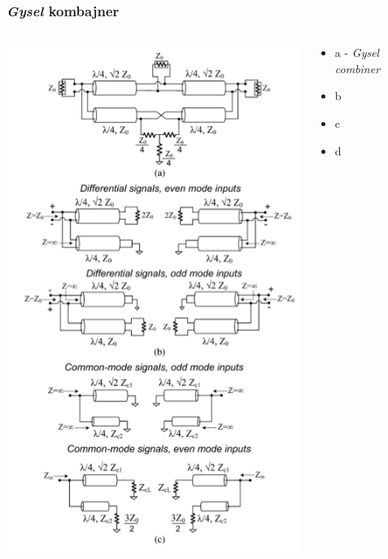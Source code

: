 \documentclass{beamer}
\begin{document}
\begin{frame}
  \frametitle{\textit{Gysel} kombajner}
  \begin{columns}
  \begin{column}{0.5\textwidth}
    \includegraphics[width=0.85\linewidth]{Gysel-power-combiner.png}
  \end{column}
  \begin{column}{0.5\textwidth}
    \begin{itemize}
      \item a - \textit{Gysel combiner}
      \item b
      \item c
      \item d
    \end{itemize}
  \end{column}
  \end{columns}
\end{frame}
\end{document}
